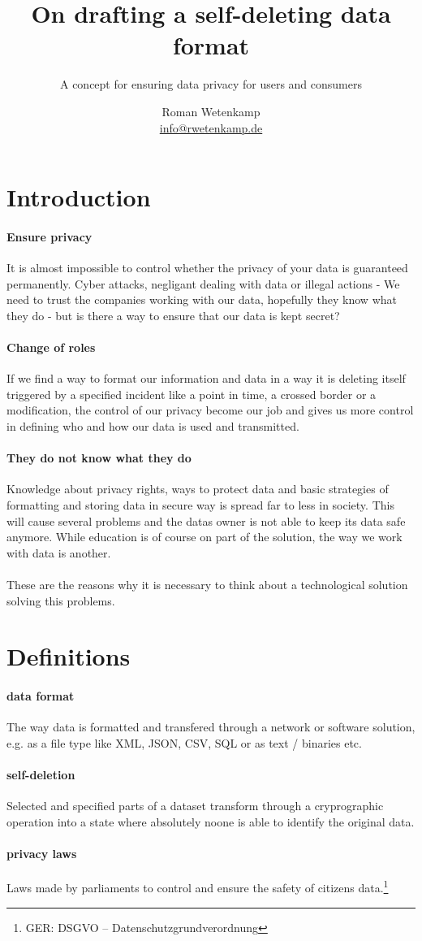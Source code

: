 \documentclass[11pt,a4paper,twocolumn]{scrartcl}
\title{On drafting a self-deleting data format}
\subtitle{A concept for ensuring data privacy for users and consumers}
\author{Roman Wetenkamp \\\url{info@rwetenkamp.de}}
\begin{document}
\maketitle
\tableofcontents
\section{Introduction}
\paragraph{Ensure privacy} It is almost impossible to control whether the privacy of your data is guaranteed permanently. Cyber attacks, negligant dealing with data or illegal actions - We need to trust the companies working with our data, hopefully they know what they do - but is there a way to ensure that our data is kept secret?
\paragraph{Change of roles}
If we find a way to format our information and data in a way it is deleting itself triggered by a specified incident like a point in time, a crossed border or a modification, the control of our privacy become our job and gives us more control in defining who and how our data is used and transmitted.
\paragraph{{\glqq}They do not know what they do{\grqq}} Knowledge about privacy rights, ways to protect data and basic strategies of formatting and storing data in secure way is spread far to less in society. This will cause several problems and the datas owner is not able to keep its data safe anymore. While education is of course on part of the solution, the way we work with data is another.
\\\\
These are the reasons why it is necessary to think about a technological solution solving this problems.
\section{Definitions}
\paragraph{data format} The way data is formatted and transfered through a network or software solution, e.g. as a file type like XML, JSON, CSV, SQL or as text / binaries etc.
\paragraph{self-deletion} Selected and specified parts of a dataset transform through a cryprographic operation into a state where absolutely noone is able to identify the original data.
\paragraph{privacy laws} Laws made by parliaments to control and ensure the safety of citizens data.{\footnote{GER: DSGVO -- Datenschutzgrundverordnung}}
\end{document}
